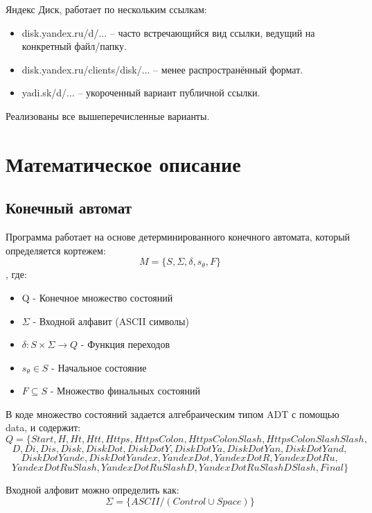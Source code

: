 \documentclass[areasetadvanced]{scrartcl}
\begin{document}
Яндекс Диск, работает по нескольким ссылкам:
\begin{itemize}
    \item disk.yandex.ru/d/... – часто встречающийся вид ссылки, ведущий на конкретный файл/папку.
    \item disk.yandex.ru/clients/disk/... – менее распространённый формат.
    \item yadi.sk/d/... – укороченный вариант публичной ссылки.
\end{itemize}
Реализованы все вышеперечисленные варианты.
\newpage
\section{Математическое описание}
\subsection{Конечный автомат}
Программа работает на основе детерминированного конечного автомата, который определяется кортежем:
\[M = \{S, \Sigma, \delta, s_\theta, F\}\]
, где:
\begin{itemize}
    \item Q - Конечное множество состояний 
    \item $\Sigma$ - Входной алфавит (ASCII символы)
    \item $\delta : S \times \Sigma \rightarrow Q$ - Функция переходов 
    \item $s_\theta \in S$ - Начальное состояние 
    \item $F \subseteq S$ - Множество финальных состояний
\end{itemize}
В коде множество состояний задается алгебраическим типом ADT с помощью data, и содержит:
\[Q = \{Start, H, Ht, Htt, Https, HttpsColon, HttpsColonSlash, HttpsColonSlashSlash,\]
\[D, Di, Dis, Disk, DiskDot, DiskDotY, DiskDotYa, DiskDotYan, DiskDotYand,\]
\[DiskDotYande, DiskDotYandex, YandexDot, YandexDotR, YandexDotRu,\]
\[YandexDotRuSlash, YandexDotRuSlashD, YandexDotRuSlashDSlash, Final\}\]

Входной алфовит можно определить как: 
\[\Sigma = \{ASCII/(Control \cup Space)\} \]
\end{document}
